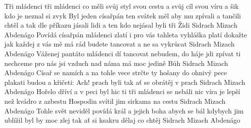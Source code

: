 \begin{TEXT}{Tři mládenci}
\SLOKA {} tři mládenci co měli svůj styl\NL
{} svou cestu a  svůj cíl\NL
{} svou víru a  šik\NL
{} kdo je neznal  si zvyk\NL
{}   
\SLOKA Byl jeden císařpán ten svátek měl\NL
aby mu zpívali a tančili chtěl\NL
a tak dle příkazu jásali lidi\NL
a ten kdo nejásal byli tři Židi\NL
Sidrach Mizach Abdenágo
\SLOKA Povídá císařpán mládenci zlatí\NL
i pro vás tahleta vyhláška platí\NL
dokažte jak každej z vás mě má rád\NL
budete tancovat a ne sa vykrůcat\NL
Sidrach Mizach Abdenágo
\SLOKA Váženej pantáto mládenci dí\NL
tancovat nebudem, do háje jdi\NL
zpívat ti nechceme pro nás jsi vzduch\NL
nad náma má moc jedině Bůh\NL
Sidrach Mizach Abdenágo
\SLOKA Císař se namích a na tohle vece\NL
strčte ty hošany do ohnivý pece\NL
plakati budou a křičeti: Ach!\NL
prach byli tak ať se obrátěj v prach\NL
Sidrach Mizach Abdenágo
\SLOKA Hořelo dříví a v peci byl hic\NL
ti tři mládenci se nebáli nic\NL
víra je lepší než kvádro z azbestu\NL
Hospodin svítil jim sirkama na cestu\NL
Sidrach Mizach Abdenágo
\SLOKA Tohle svět neviděl povídá král\NL
a jejich boha abych se bál\NL
kdybych jim ublížil byl by moc zlej\NL
tak ať si ksakru dělaj co chtěj\NL
Sidrach Mizach Abdenágo
\end{TEXT}
